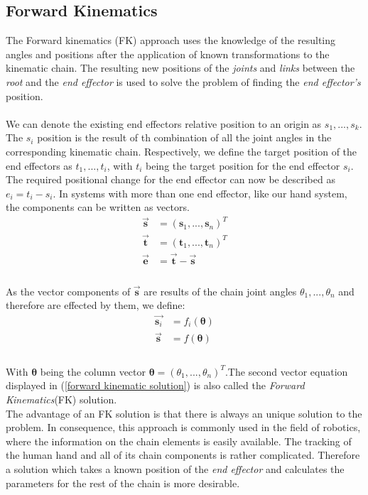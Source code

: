 \subsection{Forward Kinematics}
  \label{sec:Forward Kinematics} 
The Forward kinematics (FK) approach uses the knowledge of the resulting angles and positions after the application of known transformations to the kinematic chain. The resulting new positions of the \textit{joints} and \textit{links} between the \textit{root} and the \textit{end effector} is used to solve the problem of finding the \textit{end effector's} position.\\\\
We can denote the existing end effectors relative position to an origin as $ s_{1},...,s_{k}$. The $s_{i}$ position is the result of th combination of all the joint angles in the corresponding kinematic chain. Respectively, we define the target position of the end effectors as $t_{1},...,t_{i}$, with $t_{i}$ being the target position for the end effector $s_{i}$. The required positional change for the end effector can now be described as $e_{i}=t_{i}-s_{i}$. In systems with more than one end effector, like our hand system, the components can be written as vectors.\\
\begin{equation}
\label{fk components}
\begin{split}
\vec{\textbf{s}}&=(\textbf{s}_{1},...,\textbf{s}_{n})^{T}\\
\vec{\textbf{t}}&=(\textbf{t}_{1},...,\textbf{t}_{n})^{T}\\
\vec{\textbf{e}}&= \vec{\textbf{t}}-\vec{\textbf{s}}\\
\end{split}
\end{equation}
\\As the vector components of $\vec{\textbf{s}}$ are results of the chain joint angles $\theta_{1},...,\theta_{n}$ and therefore are effected by them, we define: \\
\begin{equation}
\label{forward kinematic solution}
\begin{split}
\vec{\textbf{s}_{i}}&=f_{i}(\pmb{\theta})\\
\vec{\textbf{s}}&=f(\pmb{\theta})\\
\end{split}
\end{equation}
\\With $\pmb{\theta}$ being the column vector $\pmb{\theta}=(\theta_{1},...,\theta_{n})^{T}$.The second vector equation displayed in (\ref{forward kinematic solution}) is also called the \textit{Forward Kinematics}(FK) solution.\\
The advantage of an FK solution is that there is always an unique solution to the problem. In consequence, this approach is commonly used in the field of robotics, where the information on the chain elements is easily available.
The tracking of the human hand and all of its chain components is rather complicated. Therefore a solution which takes a known position of the \textit{end effector} and calculates the parameters for the rest of the chain is more desirable.
